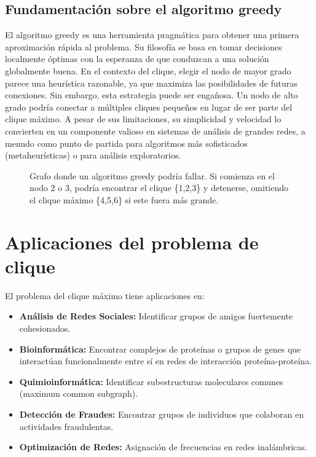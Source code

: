 \documentclass[12pt,a4paper]{report}
\begin{document}
\subsection{Fundamentación sobre el algoritmo greedy}
El algoritmo greedy es una herramienta pragmática para obtener una primera aproximación rápida al problema. Su filosofía se basa en tomar decisiones localmente óptimas con la esperanza de que conduzcan a una solución globalmente buena. En el contexto del clique, elegir el nodo de mayor grado parece una heurística razonable, ya que maximiza las posibilidades de futuras conexiones. Sin embargo, esta estrategia puede ser engañosa. Un nodo de alto grado podría conectar a múltiples cliques pequeños en lugar de ser parte del clique máximo. A pesar de sus limitaciones, su simplicidad y velocidad lo convierten en un componente valioso en sistemas de análisis de grandes redes, a menudo como punto de partida para algoritmos más sofisticados (metaheurísticas) o para análisis exploratorios.

\begin{figure}[H]
    \centering
    \caption{Grafo donde un algoritmo greedy podría fallar. Si comienza en el nodo 2 o 3, podría encontrar el clique \{1,2,3\} y detenerse, omitiendo el clique máximo \{4,5,6\} si este fuera más grande.}
    \label{fig:grafo_greedy_fail}
\end{figure}

\section{Aplicaciones del problema de clique}
El problema del clique máximo tiene aplicaciones en:
\begin{itemize}
    \item \textbf{Análisis de Redes Sociales:} Identificar grupos de amigos fuertemente cohesionados.
    \item \textbf{Bioinformática:} Encontrar complejos de proteínas o grupos de genes que interactúan funcionalmente entre sí en redes de interacción proteína-proteína.
    \item \textbf{Quimioinformática:} Identificar subestructuras moleculares comunes (maximum common subgraph).
    \item \textbf{Detección de Fraudes:} Encontrar grupos de individuos que colaboran en actividades fraudulentas.
    \item \textbf{Optimización de Redes:} Asignación de frecuencias en redes inalámbricas.
\end{itemize}
\end{document}
